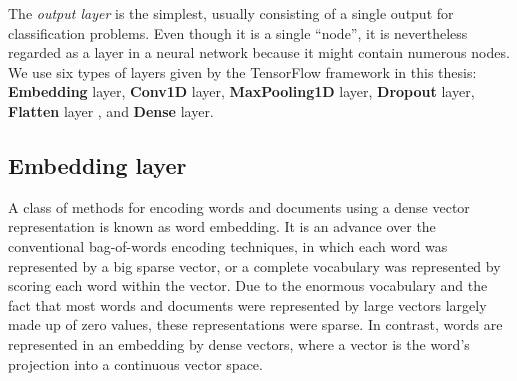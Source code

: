 The \emph{output layer} is the simplest, usually consisting of a single output for classification problems. Even though it is a single ``node'', it is nevertheless regarded as a layer in a neural network because it might contain numerous nodes. We use six types of layers given by the TensorFlow framework in this thesis: \textbf{Embedding} layer, \textbf{Conv1D} layer, \textbf{MaxPooling1D} layer, \textbf{Dropout} layer, \textbf{Flatten} layer , and \textbf{Dense} layer.

\subsection{Embedding layer}
\hspace{0.5cm}A class of methods for encoding words and documents using a dense vector representation is known as word embedding. It is an advance over the conventional bag-of-words encoding techniques, in which each word was represented by a big sparse vector, or a complete vocabulary was represented by scoring each word within the vector. Due to the enormous vocabulary and the fact that most words and documents were represented by large vectors largely made up of zero values, these representations were sparse. In contrast, words are represented in an embedding by dense vectors, where a vector is the word's projection into a continuous vector space.

